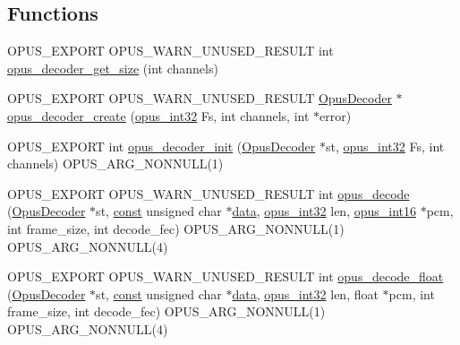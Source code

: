 \subsection*{Functions}
\begin{DoxyCompactItemize}
\item 
O\+P\+U\+S\+\_\+\+E\+X\+P\+O\+RT O\+P\+U\+S\+\_\+\+W\+A\+R\+N\+\_\+\+U\+N\+U\+S\+E\+D\+\_\+\+R\+E\+S\+U\+LT int \hyperlink{group__opus__decoder_gaee52cd75f7160fda7a0916d72363940b}{opus\+\_\+decoder\+\_\+get\+\_\+size} (int channels)
\item 
O\+P\+U\+S\+\_\+\+E\+X\+P\+O\+RT O\+P\+U\+S\+\_\+\+W\+A\+R\+N\+\_\+\+U\+N\+U\+S\+E\+D\+\_\+\+R\+E\+S\+U\+LT \hyperlink{group__opus__decoder_ga401d8579958d36094715a6b90cd159a6}{Opus\+Decoder} $\ast$ \hyperlink{group__opus__decoder_ga6a06f16309dee5883c27223d127c4300}{opus\+\_\+decoder\+\_\+create} (\hyperlink{opus__types_8h_aa4d309d6f80b99dbabebc8f98879ab9a}{opus\+\_\+int32} Fs, int channels, int $\ast$error)
\item 
O\+P\+U\+S\+\_\+\+E\+X\+P\+O\+RT int \hyperlink{group__opus__decoder_ga40746b48a7b1653987a3a6db2ce3a40b}{opus\+\_\+decoder\+\_\+init} (\hyperlink{group__opus__decoder_ga401d8579958d36094715a6b90cd159a6}{Opus\+Decoder} $\ast$st, \hyperlink{opus__types_8h_aa4d309d6f80b99dbabebc8f98879ab9a}{opus\+\_\+int32} Fs, int channels) O\+P\+U\+S\+\_\+\+A\+R\+G\+\_\+\+N\+O\+N\+N\+U\+LL(1)
\item 
O\+P\+U\+S\+\_\+\+E\+X\+P\+O\+RT O\+P\+U\+S\+\_\+\+W\+A\+R\+N\+\_\+\+U\+N\+U\+S\+E\+D\+\_\+\+R\+E\+S\+U\+LT int \hyperlink{group__opus__decoder_ga3df1ea406cd9d23a63aed181903d3e5e}{opus\+\_\+decode} (\hyperlink{group__opus__decoder_ga401d8579958d36094715a6b90cd159a6}{Opus\+Decoder} $\ast$st, \hyperlink{zconf_8h_a2c212835823e3c54a8ab6d95c652660e}{const} unsigned char $\ast$\hyperlink{jpeglib_8h_aa379dc8ae39e55ae0c431a61a7d2f2bc}{data}, \hyperlink{opus__types_8h_aa4d309d6f80b99dbabebc8f98879ab9a}{opus\+\_\+int32} len, \hyperlink{opus__types_8h_acc9ed7cf60479eb81f9648c6ec27dc26}{opus\+\_\+int16} $\ast$pcm, int frame\+\_\+size, int decode\+\_\+fec) O\+P\+U\+S\+\_\+\+A\+R\+G\+\_\+\+N\+O\+N\+N\+U\+LL(1) O\+P\+U\+S\+\_\+\+A\+R\+G\+\_\+\+N\+O\+N\+N\+U\+LL(4)
\item 
O\+P\+U\+S\+\_\+\+E\+X\+P\+O\+RT O\+P\+U\+S\+\_\+\+W\+A\+R\+N\+\_\+\+U\+N\+U\+S\+E\+D\+\_\+\+R\+E\+S\+U\+LT int \hyperlink{group__opus__decoder_gafe994758c0d6fa49cd38d63331d47bd4}{opus\+\_\+decode\+\_\+float} (\hyperlink{group__opus__decoder_ga401d8579958d36094715a6b90cd159a6}{Opus\+Decoder} $\ast$st, \hyperlink{zconf_8h_a2c212835823e3c54a8ab6d95c652660e}{const} unsigned char $\ast$\hyperlink{jpeglib_8h_aa379dc8ae39e55ae0c431a61a7d2f2bc}{data}, \hyperlink{opus__types_8h_aa4d309d6f80b99dbabebc8f98879ab9a}{opus\+\_\+int32} len, float $\ast$pcm, int frame\+\_\+size, int decode\+\_\+fec) O\+P\+U\+S\+\_\+\+A\+R\+G\+\_\+\+N\+O\+N\+N\+U\+LL(1) O\+P\+U\+S\+\_\+\+A\+R\+G\+\_\+\+N\+O\+N\+N\+U\+LL(4)

\end{DoxyCompactItemize}
